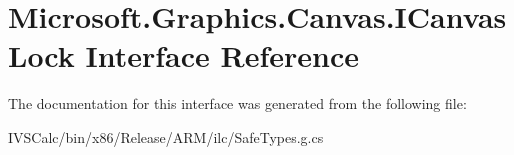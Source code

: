 \hypertarget{interface_microsoft_1_1_graphics_1_1_canvas_1_1_i_canvas_lock}{}\section{Microsoft.\+Graphics.\+Canvas.\+I\+Canvas\+Lock Interface Reference}
\label{interface_microsoft_1_1_graphics_1_1_canvas_1_1_i_canvas_lock}


The documentation for this interface was generated from the following file\+:\begin{DoxyCompactItemize}
\item 
I\+V\+S\+Calc/bin/x86/\+Release/\+A\+R\+M/ilc/Safe\+Types.\+g.\+cs\end{DoxyCompactItemize}
